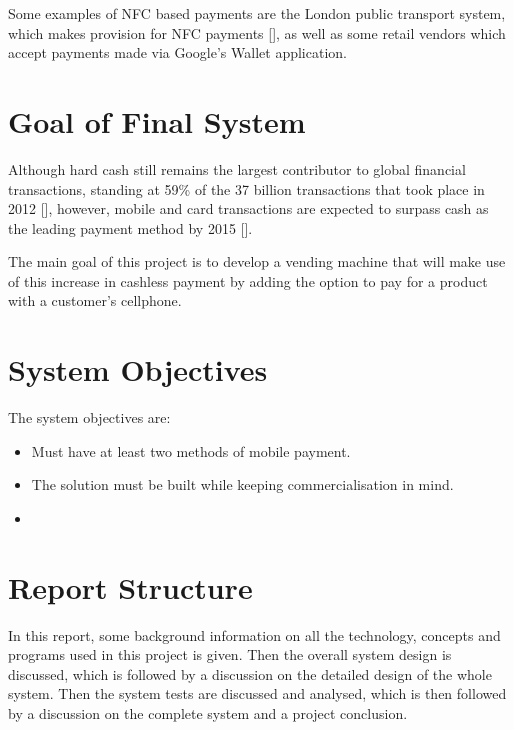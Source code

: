 Some examples of NFC based payments are the London public transport system, which makes
provision for NFC payments [\cite{website:nfc-underground}], as well as some retail vendors
which accept payments made via Google's Wallet application.

\section{Goal of Final System}

Although hard cash still remains the largest contributor to global financial transactions,
standing at 59\% of the 37 billion transactions that took place in 2012 [\cite{website:money-transactions}], however,
mobile and card transactions are expected to surpass cash as the leading payment method by 2015
[\cite{website:money-transactions}]. 

The main goal of this project is to develop a vending machine that will make use of this
increase in cashless payment by adding the option to pay for a product with a customer's
cellphone. 

\section{System Objectives}

The system objectives are:

\begin{itemize}
  \item Must have at least two methods of mobile payment.
  \item The solution must be built while keeping commercialisation in mind.
  \item 
\end{itemize}

\section{Report Structure}

In this report, some background information on all the technology, concepts and programs used
in this project is given. Then the overall system design is discussed, which is followed by
a discussion on the detailed design of the whole system. Then the system tests are discussed
and analysed, which is then followed by a discussion on the complete system and a
project conclusion.
